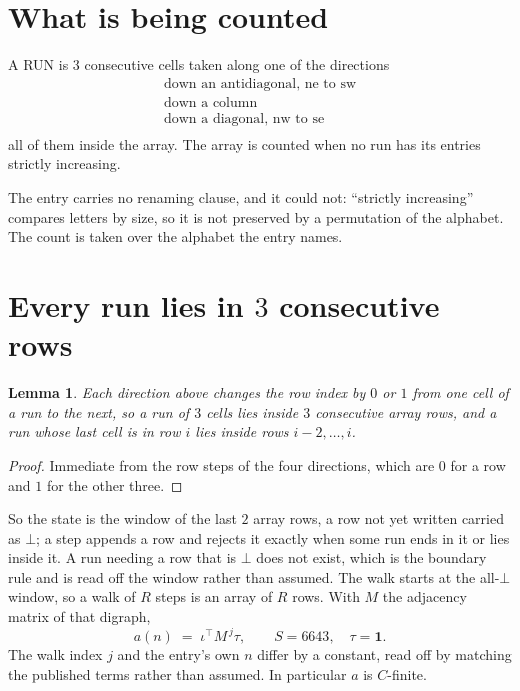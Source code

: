 \documentclass[11pt,a4paper]{article}
\theoremstyle{plain}
\newtheorem{lemma}[theorem]{Lemma}
\theoremstyle{definition}
\begin{document}
\section{What is being counted}

A RUN is $3$ consecutive cells taken along one of the directions
\[
\begin{array}{l}
\text{down an antidiagonal, ne to sw} \\
\text{down a column} \\
\text{down a diagonal, nw to se} \\
\end{array}
\]
all of them inside the array. The array is counted when no run has its entries strictly increasing.


The entry carries no renaming clause, and it could not: ``strictly increasing'' compares
letters by size, so it is not preserved by a permutation of the alphabet. The count is taken
over the alphabet the entry names.

\section{Every run lies in $3$ consecutive rows}

\begin{lemma}\label{lem:win}
Each direction above changes the row index by $0$ or $1$ from one cell of a run to the next, so
a run of $3$ cells lies inside $3$ consecutive array rows, and a run whose last cell is in
row $i$ lies inside rows $i-2,\dots,i$.
\end{lemma}

\begin{proof}
Immediate from the row steps of the four directions, which are $0$ for a row and $1$ for the
other three.
\end{proof}

So the state is the window of the last $2$ array rows, a row not yet written carried as
$\bot$; a step appends a row and rejects it exactly when some run ends in it or lies inside it.
A run needing a row that is $\bot$ does not exist, which is the boundary rule and is read off
the window rather than assumed. The walk starts at the all-$\bot$ window, so a walk of $R$ steps
is an array of $R$ rows. With $M$ the adjacency matrix of that digraph,
\[
a(n)\;=\;\iota^{\!\top}M^{\,j}\tau ,\qquad S=6643,\quad\tau=\mathbf{1} .
\]
The walk index $j$ and the entry's own $n$ differ by a constant, read off by matching the
published terms rather than assumed. In particular $a$ is $C$-finite.
\end{document}
